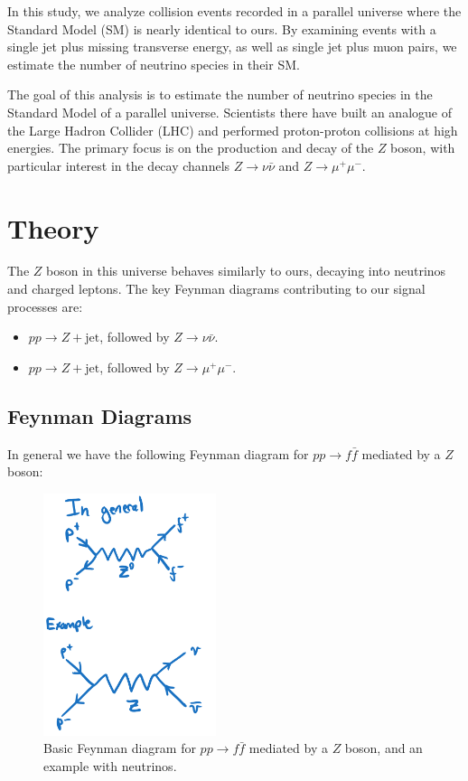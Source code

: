 In this study, we analyze collision events recorded in a parallel universe where the Standard Model (SM) is nearly identical to ours. By examining events with a single jet plus missing transverse energy, as well as single jet plus muon pairs, we estimate the number of neutrino species in their SM.

The goal of this analysis is to estimate the number of neutrino species in the Standard Model of a parallel universe. Scientists there have built an analogue of the Large Hadron Collider (LHC) and performed proton-proton collisions at high energies. The primary focus is on the production and decay of the $Z$ boson, with particular interest in the decay channels $Z \to \nu \bar{\nu}$ and $Z \to \mu^+ \mu^-$. 


\section{Theory}
The $Z$ boson in this universe behaves similarly to ours, decaying into neutrinos and charged leptons. The key Feynman diagrams contributing to our signal processes are:

\begin{itemize}[label=\(\ \bigstar \)]
    \item $pp \to Z + \text{jet}$, followed by $Z \to \nu \bar{\nu}$.
    \item $pp \to Z + \text{jet}$, followed by $Z \to \mu^+ \mu^-$. 
\end{itemize}

\subsection{Feynman Diagrams}
In general we have the following Feynman diagram for \( pp \to f \bar{f} \) mediated by a \( Z \) boson:
\begin{figure}[H]
    \centering
    \includegraphics[width=0.45\textwidth]{AnalyzingColliderEvents/figures/ingeneral.png}
    \caption{Basic Feynman diagram for \( pp \to f \bar{f} \) mediated by a \( Z \) boson, and an example with neutrinos.}
\end{figure}

